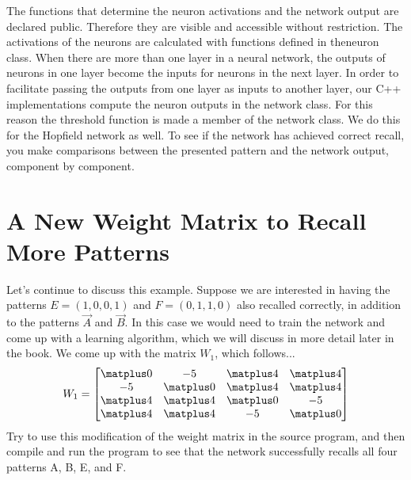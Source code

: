 The functions that determine the neuron activations and the network output are
declared public. Therefore they are visible and accessible without restriction.
The activations of the neurons are calculated with functions defined in theneuron class. When there are more than one layer in a neural network, the
outputs of neurons in one layer become the inputs for neurons in the next
layer. In order to facilitate passing the outputs from one layer as inputs to
another layer, our C++ implementations compute the neuron outputs in the
network class. For this reason the threshold function is made a member of the
network class. We do this for the Hopfield network as well. To see if the
network has achieved correct recall, you make comparisons between the
presented pattern and the network output, component by component.

\section{A New Weight Matrix to Recall More Patterns}
Let’s continue to discuss this example. Suppose we are interested in having the
patterns $E = (1, 0, 0, 1)$ and $F = (0, 1, 1, 0)$ also recalled correctly, in addition
to the patterns $\vec{A}$ and $\vec{B}$. In this case we would need to train the network and
come up with a learning algorithm, which we will discuss in more detail later
in the book. We come up with the matrix $W_1$, which follows...
\[ 
W_1 = \begin{bmatrix}
 \matplus0 & -5 &  \matplus4 & \matplus4 \\
-5 &  \matplus0 &  \matplus4 & \matplus4 \\
 \matplus4 &  \matplus4 &  \matplus0 & -5 \\
 \matplus4 &  \matplus4 & -5 &  \matplus0 \\
\end{bmatrix}
\]
Try to use this modification of the weight matrix in the source program, and
then compile and run the program to see that the network successfully recalls
all four patterns A, B, E, and F.

